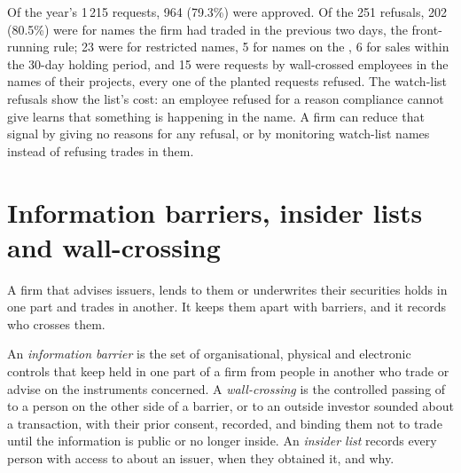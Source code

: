 Of the year's 1\,215 requests, 964 (79.3\%) were approved. Of the 251 refusals, 202 (80.5\%) were for names the firm had traded in the previous two
days, the front-running rule; 23 were for restricted names, 5 for names on the , 6 for sales within the 30-day holding period, and 15
were requests by wall-crossed employees in the names of their projects, every one of the planted requests refused. The watch-list refusals show
the list's cost: an employee refused for a reason compliance cannot give learns that something is happening in the name. A firm can reduce that
signal by giving no reasons for any refusal, or by monitoring watch-list names instead of refusing trades in them.

\section{Information barriers, insider lists and wall-crossing}

A firm that advises issuers, lends to them or underwrites their securities holds  in one part and trades in another. It keeps
them apart with barriers, and it records who crosses them.

\begin{definition}\label{def:fm:compliance-and-market-abuse:barrier}
An \emph{information barrier} is the set of organisational, physical and electronic controls that keep  held in one part of a firm from people in another who trade or advise on the instruments concerned. A
\emph{wall-crossing} is the controlled passing of  to a person on the other side of a barrier, or to an
outside investor sounded about a transaction, with their prior consent, recorded, and binding them not to trade until the information is public or
no longer inside. An \emph{insider list} records every person with access to  about an issuer, when they
obtained it, and why.
\end{definition}

